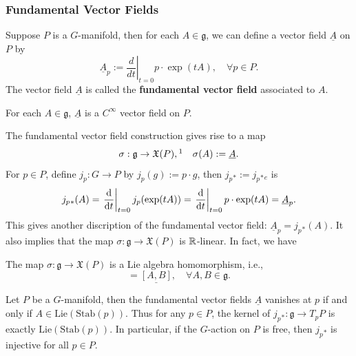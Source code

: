 \subsubsection*{Fundamental Vector Fields}
Suppose $P$ is a $G$-manifold, then for each $A\in\mathfrak{g}$, we can define a vector field $\underline{A}$ on $P$ by
\begin{equation*}
    \underline{A}_p := \left.\frac{d}{dt}\right|_{t=0} p\cdot\exp(tA), \quad \forall p\in P.
\end{equation*}
The vector field $\underline{A}$ is called the \textbf{fundamental vector field} associated to $A$.
\begin{fact}
    For each $A\in\mathfrak{g}$, $\underline{A}$ is a $C^\infty$ vector field on $P$.
\end{fact} 
The fundamental vector field construction gives rise to a map 
\begin{equation*}
    \sigma: \mathfrak{g}\to\mathfrak{X}(P),\footnotemark \quad \sigma(A):=\underline{A}.
\end{equation*}
For $p\in P$, define $j_p: G\to P$ by $j_p(g) := p\cdot g$, then $j_p{}_*:=j_p{}_*{}_e$ is 
\begin{equation*}
    j_p{}_*(A) = \left.\frac{{\rm d}}{{\rm d} t}\right|_{t=0} j_p(\exp(tA)) 
    = \left.\frac{{\rm d}}{{\rm d} t}\right|_{t=0} p\cdot\exp(tA) = \underline{A}_p.
\end{equation*}
This gives another discription of the fundamental vector field: $\underline{A}_p = j_p{}_*(A)$. 
It also implies that the map $\sigma: \mathfrak{g}\to\mathfrak{X}(P)$ is $\mathbb{R}$-linear. In fact, we have 
\begin{fact}
    The map $\sigma: \mathfrak{g}\to\mathfrak{X}(P)$ is a Lie algebra homomorphism, i.e., 
    \begin{equation*}
        [\underline{A}, \underline{B}] = \underline{[A,B]}, \quad \forall A,B\in\mathfrak{g}.
    \end{equation*}
\end{fact}
\begin{fact}
    Let $P$ be a $G$-manifold, then the fundamental vector fields $\underline{A}$ vanishes at $p$ 
    if and only if $A\in\mathrm{Lie}(\mathrm{Stab}(p))$. Thus for any $p\in P$, the kernel of 
    $j_p{}_*:\mathfrak{g}\to T_pP$ is exactly $\mathrm{Lie}(\mathrm{Stab}(p))$. In particular, 
    if the $G$-action on $P$ is free, then $j_p{}_*$ is injective for all $p\in P$.
\end{fact}
